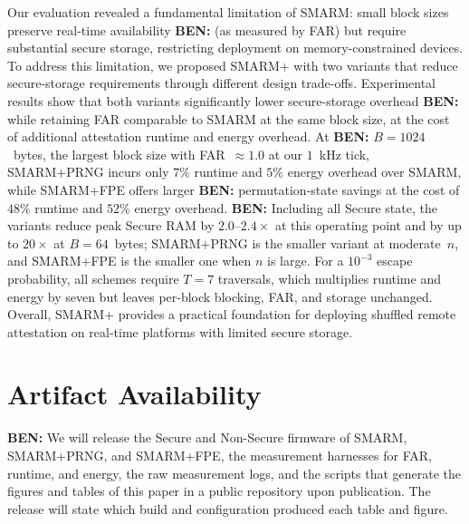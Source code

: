 \documentclass{ieeeaccess}
\DeclareRobustCommand{\ben}[1]{{\color{BENcolor}\textbf{BEN:} #1}}
\newcommand{\rtsmarm}{SMARM+\xspace}
\newcommand{\rtsmarmone}{SMARM+PRNG\xspace}
\newcommand{\rtsmarmtwo}{SMARM+FPE\xspace}
\begin{document}
Our evaluation revealed a fundamental limitation of SMARM: small block sizes preserve real-time availability \ben{(as measured by FAR)} but require substantial secure storage, restricting deployment on memory-constrained devices. To address 
this limitation, we proposed \rtsmarm with two variants that reduce secure-storage requirements through different design trade-offs. Experimental results show that both variants significantly lower secure-storage overhead \ben{while retaining FAR comparable to SMARM at the same block size}, at 
the cost of additional attestation runtime and energy overhead. At \ben{$B = 1024$~bytes, the largest block size with FAR~$\approx 1.0$ at our $1$~kHz tick}, \rtsmarmone incurs only $7\%$ runtime and $5\%$ energy overhead over SMARM, while \rtsmarmtwo offers larger \ben{permutation-state} savings at the cost of $48\%$ runtime and $52\%$ energy overhead.
\ben{Including all Secure state, the variants reduce peak Secure RAM by $2.0$--$2.4\times$ at this operating point and by up to $20\times$ at $B = 64$~bytes; \rtsmarmone is the smaller variant at moderate~$n$, and \rtsmarmtwo is the smaller one when $n$ is large.
For a $10^{-3}$ escape probability, all schemes require $T = 7$ traversals, which multiplies runtime and energy by seven but leaves per-block blocking, FAR, and storage unchanged.}
Overall, \rtsmarm provides a practical foundation for 
deploying shuffled remote attestation on real-time platforms with limited secure storage.

\section*{Artifact Availability}
\ben{We will release the Secure and Non-Secure firmware of SMARM, \rtsmarmone, and \rtsmarmtwo, the measurement harnesses for FAR, runtime, and energy, the raw measurement logs, and the scripts that generate the figures and tables of this paper in a public repository upon publication.
The release will state which build and configuration produced each table and figure.}






\end{document}
